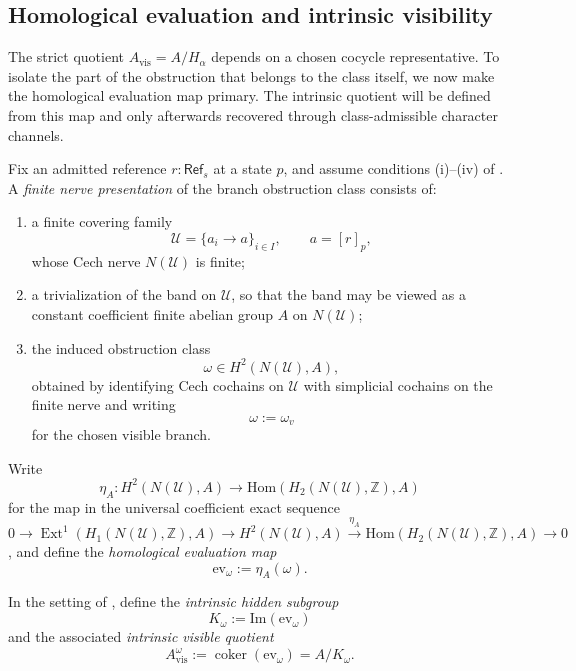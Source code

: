 \subsection{Homological evaluation and intrinsic visibility}

The strict quotient $A_{\mathrm{vis}}=A/H_\alpha$ depends on a chosen cocycle representative. To isolate the part of the obstruction that belongs to the class itself, we now make the homological evaluation map primary. The intrinsic quotient will be defined from this map and only afterwards recovered through class-admissible character channels.

\begin{definition}\label{def:finite-nerve-presentation}
Fix an admitted reference $r:\mathsf{Ref}_s$ at a state $p$, and assume conditions \textup{(i)}--\textup{(iv)} of . A \emph{finite nerve presentation} of the branch obstruction class consists of:
\begin{enumerate}[label=(\roman*),nosep]
\item a finite covering family
\[
\mathcal U=\{a_i\to a\}_{i\in I},
\qquad
a=[r]_p,
\]
whose Cech nerve $N(\mathcal U)$ is finite;
\item a trivialization of the band on $\mathcal U$, so that the band may be viewed as a constant coefficient finite abelian group $A$ on $N(\mathcal U)$;
\item the induced obstruction class
\[
\omega\in H^2(N(\mathcal U),A),
\]
obtained by identifying Cech cochains on $\mathcal U$ with simplicial cochains on the finite nerve and writing
\[
\omega:=\omega_v
\]
for the chosen visible branch.
\end{enumerate}
Write
\[
\eta_A:H^2(N(\mathcal U),A)\longrightarrow \mathrm{Hom}(H_2(N(\mathcal U),\mathbb Z),A)
\]
for the map in the universal coefficient exact sequence
\[
0\to \operatorname{Ext}^1(H_1(N(\mathcal U),\mathbb Z),A)\to H^2(N(\mathcal U),A)\xrightarrow{\eta_A}\mathrm{Hom}(H_2(N(\mathcal U),\mathbb Z),A)\to 0
\]
\cite[Sec.~3.1]{Hatcher2002}, and define the \emph{homological evaluation map}
\[
\mathrm{ev}_{\omega}:=\eta_A(\omega).
\]
\end{definition}

\begin{definition}\label{def:intrinsic-visible-quotient}
In the setting of , define the \emph{intrinsic hidden subgroup}
\[
K_{\omega}:=\mathrm{Im}(\mathrm{ev}_{\omega})
\]
and the associated \emph{intrinsic visible quotient}
\[
A_{\mathrm{vis}}^{\omega}:=\operatorname{coker}(\mathrm{ev}_{\omega})=A/K_{\omega}.
\]
\end{definition}

